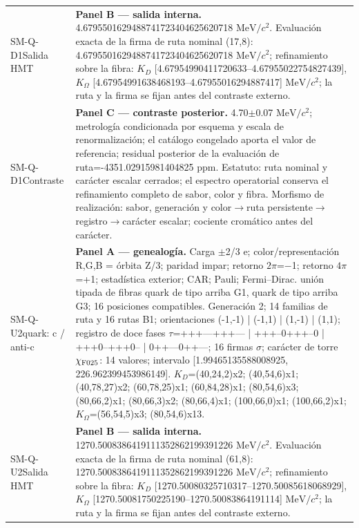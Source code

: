 \begin{longtable}{@{}>{\raggedright\arraybackslash}p{2.55cm}>{\raggedright\arraybackslash}p{11.75cm}@{}}
SM-Q-D1\newline Salida HMT & \textbf{Panel B --- salida interna. }4.6795501629488741723404625620718 \(\mathrm{MeV}/c^2\). Evaluación exacta de la firma de ruta nominal (17,8): 4.6795501629488741723404625620718 \(\mathrm{MeV}/c^2\); refinamiento sobre la fibra: \(K_D\) [4.67954990411720633--4.67955022754827439], \(K_{\Omega}\) [4.67954991638468193--4.67955016294887417] \(\mathrm{MeV}/c^2\); la ruta y la firma se fijan antes del contraste externo. \\
SM-Q-D1\newline Contraste & \textbf{Panel C --- contraste posterior. }4.70\(\pm\)0.07 \(\mathrm{MeV}/c^2\); metrología condicionada por esquema y escala de renormalización; el catálogo congelado aporta el valor de referencia; residual posterior de la evaluación de ruta=-4351.02915981404825 ppm. Estatuto: ruta nominal y carácter escalar cerrados; el espectro operatorial conserva el refinamiento completo de sabor, color y fibra. Morfismo de realización: sabor, generación y color\(\to\)\allowbreak{}ruta persistente\(\to\)\allowbreak{}registro\(\to\)\allowbreak{}carácter escalar; cociente cromático antes del carácter. \\\addlinespace[2pt]
SM-Q-U2\newline quark: c / anti-c & \textbf{Panel A --- genealogía. }Carga \(\pm\)2/3 e; color/representación R,G,B = órbita Z/3; paridad impar; retorno \(2\pi\)=\(-\)1; retorno \(4\pi\)=+1; estadística exterior; CAR; Pauli; Fermi--Dirac. unión tipada de fibras quark de tipo arriba G1, quark de tipo arriba G3; 16 posiciones compatibles. Generación 2; 14 familias de ruta y 16 rutas B1; orientaciones (-1,-1) | (-1,1) | (1,-1) | (1,1); registro de doce fases \(\tau\)=+++---+++--- | +++--0+++--0 | +++0--+++0-- | 0++---0++---; 16 firmas \(\sigma\); carácter de torre \(\chi_{\rm F025}\): 14 valores; intervalo [1.99465135588008925, 226.962399453986149]. \(K_D\)=(40,24,2)x2; (40,54,6)x1; (40,78,27)x2; (60,78,25)x1; (60,84,28)x1; (80,54,6)x3; (80,66,2)x1; (80,66,3)x2; (80,66,4)x1; (100,66,0)x1; (100,66,2)x1; \(K_{\Omega}\)=(56,54,5)x3; (80,54,6)x13. \\
SM-Q-U2\newline Salida HMT & \textbf{Panel B --- salida interna. }1270.5008386419111352862199391226 \(\mathrm{MeV}/c^2\). Evaluación exacta de la firma de ruta nominal (61,8): 1270.5008386419111352862199391226 \(\mathrm{MeV}/c^2\); refinamiento sobre la fibra: \(K_D\) [1270.50080325710317--1270.50085618068929], \(K_{\Omega}\) [1270.50081750225190--1270.50083864191114] \(\mathrm{MeV}/c^2\); la ruta y la firma se fijan antes del contraste externo. \\

\end{longtable}
